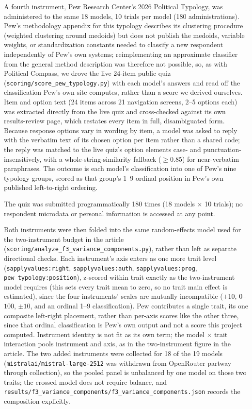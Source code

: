 \documentclass[11pt]{article}
\begin{document}
A fourth instrument, Pew Research Center's 2026 Political Typology, was
administered to the same 18 models, 10 trials per model (180
administrations). Pew's methodology appendix for this typology describes
its clustering procedure (weighted clustering around medoids) but does not
publish the medoids, variable weights, or standardization constants needed
to classify a new respondent independently of Pew's own systems;
reimplementing an approximate classifier from the general method
description was therefore not possible, so, as with Political Compass, we
drove the live 24-item public quiz (\texttt{scoring/score\_pew\_typology.py})
with each model's answers and read off the classification Pew's own site
computes, rather than a score we derived ourselves. Item and option text (24
items across 21 navigation screens, 2--5 options each) was extracted
directly from the live quiz and cross-checked against its own
results-review page, which restates every item in full, disambiguated form.
Because response options vary in wording by item, a model was asked to
reply with the verbatim text of its chosen option per item rather than a
shared code; the reply was matched to the live quiz's option elements case-
and punctuation-insensitively, with a whole-string-similarity fallback
($\geq 0.85$) for near-verbatim paraphrases. The outcome is each model's
classification into one of Pew's nine typology groups, scored as that
group's 1--9 ordinal position in Pew's own published left-to-right ordering.

The quiz was submitted programmatically 180 times (18 models $\times$ 10 trials); no respondent microdata or personal information is accessed at any point.

Both instruments were then folded into the same random-effects model
used for the two-instrument budget in the article
(\texttt{scoring/analyze\_f3\_variance\_components.py}), rather than left as
separate directional checks. Each instrument's axis enters as one more
trait level (\texttt{sapplyvalues:right}, \texttt{sapplyvalues:auth},
\texttt{sapplyvalues:prog}, \texttt{pew\_typology:position}), z-scored
within trait exactly as the two-instrument model requires (this sets every trait mean to zero, so no trait main effect is estimated), since the four
instruments' scales are mutually incompatible ($\pm10$, $0$--$100$, $\pm10$,
and an ordinal 1--9 classification). Pew contributes a single trait, its one
composite left-right placement, rather than per-axis scores like the other
three, since that ordinal classification is Pew's own output and not a
score this project computed. Instrument identity is not fit as its own term; the model $\times$ trait interaction pools instrument and axis, as in the two-instrument figure in the article. The two added instruments were collected for 18 of the 19 models
(\texttt{mistralai/mistral-large-2512} was withdrawn from OpenRouter
partway through collection), so the pooled panel is unbalanced by one model
on those two traits; the crossed model does not require balance, and
\texttt{results/f3\_variance\_components/f3\_variance\_components.json}
records the composition explicitly.
\end{document}
